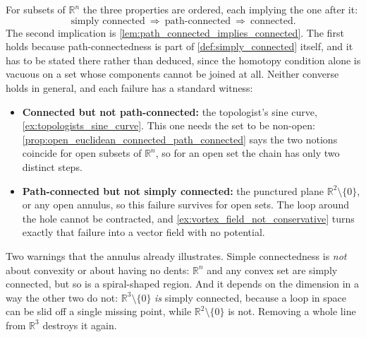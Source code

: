 \begin{importantremark}
\label{rem:three_connectedness_notions}
For subsets of $\mathbb{R}^n$ the three properties are ordered, each implying the one after it:
\[\text{simply connected} \ \Longrightarrow\ \text{path-connected}
  \ \Longrightarrow\ \text{connected}.\]
The second implication is \cref{lem:path_connected_implies_connected}. The first holds because
path-connectedness is part of \cref{def:simply_connected} itself, and it has to be stated
there rather than deduced, since the homotopy condition alone is vacuous on a set whose
components cannot be joined at all.
Neither converse holds in general, and each failure has a standard witness:
\begin{itemize}
  \item \textbf{Connected but not path-connected:} the topologist's sine curve,
    \cref{ex:topologists_sine_curve}. This one needs the set to be non-open:
    \cref{prop:open_euclidean_connected_path_connected} says the two notions coincide for open
    subsets of $\mathbb{R}^n$, so for an open set the chain has only two distinct steps.
  \item \textbf{Path-connected but not simply connected:} the punctured plane
    $\mathbb{R}^2\setminus\{0\}$, or any open annulus, so this failure survives for open sets.
    The loop around the hole cannot be contracted,
    and \cref{ex:vortex_field_not_conservative} turns exactly that failure into a vector field with
    no potential.
\end{itemize}
Two warnings that the annulus already illustrates. Simple connectedness is \emph{not} about
convexity or about having no dents: $\mathbb{R}^n$ and any convex set are simply connected, but so
is a spiral-shaped region. And it depends on the dimension in a way the other two do not:
$\mathbb{R}^3\setminus\{0\}$ \emph{is} simply connected, because a loop in space can be slid off a
single missing point, while $\mathbb{R}^2\setminus\{0\}$ is not. Removing a whole line from
$\mathbb{R}^3$ destroys it again.
\end{importantremark}


